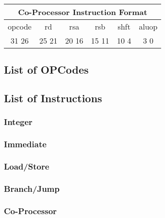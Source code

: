 \documentclass[letterpaper, 11pt]{article}
\begin{document}
\begin{center}
		\begin{tabular}{|c|c|c|c|c|c|}
				\multicolumn{6}{c}{Co-Processor Instruction Format}\\ \hline
				\hspace{2pt} opcode \hspace{2pt} & \hspace{5pt} rd \hspace{5pt} &  \hspace{4pt} rsa \hspace{4pt} & \hspace{4pt}rsb  \hspace{4pt}& \hspace{10pt}shft  \hspace{10pt} & \hspace{3pt} aluop \hspace{3pt}   \\	\hline
			31 \hfill 26& 25 \hfill 21 &20 \hfill  16& 15 \hfill  11&10 \hfill   4&3 \hfill   0\\ \hline
		
	\end{tabular}
\end{center}	
\subsection{List of OPCodes}
\subsection{List of Instructions}
\subsubsection{Integer}
\subsubsection{Immediate}
\subsubsection{Load/Store}
\subsubsection{Branch/Jump}
\subsubsection{Co-Processor}
\end{document}
